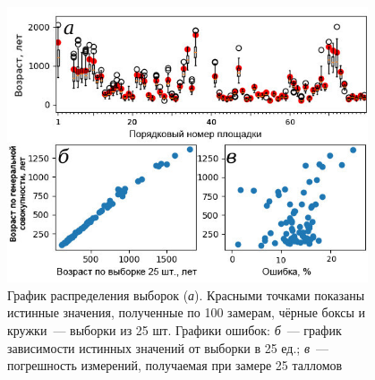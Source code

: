 \begin{figure}[H]
  \begin{center}
    \includegraphics[width=0.95\textwidth]{authors/kolegov-fig2.jpg}
  \end{center}
  \vspace{-0.5cm}
  \caption{График распределения выборок (\textit{а}). Красными точками показаны истинные значения,
полученные по 100 замерам, чёрные боксы и кружки~--- выборки из 25 шт. Графики ошибок: \textit{б}~--- график зависимости истинных значений от выборки в 25 ед.; \textit{в}~--- погрешность измерений, получаемая при замере 25 талломов}
  \label{fig:kolegov}
\end{figure}
